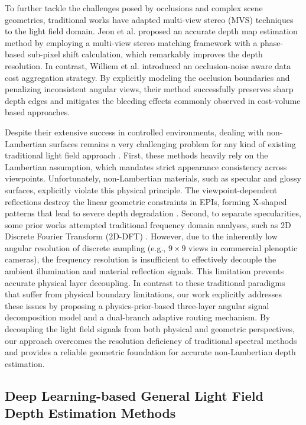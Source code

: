 \documentclass[lettersize,journal]{IEEEtran}
\begin{document}
To further tackle the challenges posed by occlusions and complex scene geometries, traditional works have adapted multi-view stereo (MVS) techniques to the light field domain. Jeon et al. \cite{Jeon,MVS,lenslet} proposed an accurate depth map estimation method by employing a multi-view stereo matching framework with a phase-based sub-pixel shift calculation, which remarkably improves the depth resolution. In contrast, Williem et al. \cite{Williem,occlusion_noise} introduced an occlusion-noise aware data cost aggregation strategy. By explicitly modeling the occlusion boundaries and penalizing inconsistent angular views, their method successfully preserves sharp depth edges and mitigates the bleeding effects commonly observed in cost-volume based approaches.

Despite their extensive success in controlled environments, dealing with non-Lambertian surfaces remains a very challenging problem for any kind of existing traditional light field approach \cite{non_Lambertian_surfaces,specular_reflection}. First, these methods heavily rely on the Lambertian assumption, which mandates strict appearance consistency across viewpoints. Unfortunately, non-Lambertian materials, such as specular and glossy surfaces, explicitly violate this physical principle. The viewpoint-dependent reflections destroy the linear geometric constraints in EPIs, forming X-shaped patterns that lead to severe depth degradation \cite{X_shaped_patterns,geometric_constraints}. Second, to separate specularities, some prior works attempted traditional frequency domain analyses, such as 2D Discrete Fourier Transform (2D-DFT) \cite{2D_DFT,frequency_domain}. However, due to the inherently low angular resolution of discrete sampling (e.g., $9 \times 9$ views in commercial plenoptic cameras), the frequency resolution is insufficient to effectively decouple the ambient illumination and material reflection signals. This limitation prevents accurate physical layer decoupling. In contrast to these traditional paradigms that suffer from physical boundary limitations, our work explicitly addresses these issues by proposing a physics-prior-based three-layer angular signal decomposition model and a dual-branch adaptive routing mechanism. By decoupling the light field signals from both physical and geometric perspectives, our approach overcomes the resolution deficiency of traditional spectral methods and provides a reliable geometric foundation for accurate non-Lambertian depth estimation.

\subsection{Deep Learning-based General Light Field Depth Estimation Methods}
\end{document}
